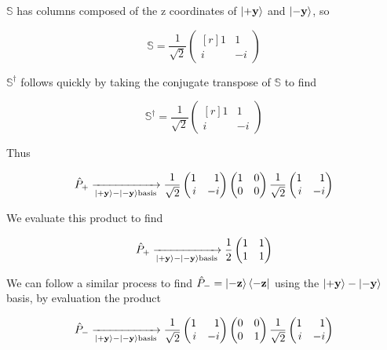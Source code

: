 \documentclass[11pt]{amsart}
\begin{document}
$\mathbb{S}$ has columns composed of the z coordinates of $\ket{+\textbf{y}}$ and $\ket{-\textbf{y}}$, so 

\[
\mathbb{S}=\frac{1}{\sqrt{2}}
\begin{pmatrix*}[r]
1&1\\
i&-i
\end{pmatrix*}
\]

$\mathbb{S}^{\dagger}$ follows quickly by taking the conjugate transpose of $\mathbb{S}$ to find

\[
\mathbb{S}^{\dagger}=\frac{1}{\sqrt{2}}
\begin{pmatrix*}[r]
1&1\\
i&-i
\end{pmatrix*}
\]

Thus 

\[
\hat{P}_+\xrightarrow[\ket{+\textbf{y}}-\ket{-\textbf{y}}\text{basis}]{}
\frac{1}{\sqrt{2}}
\begin{pmatrix*}[r]
1&1\\
i&-i
\end{pmatrix*}
\begin{pmatrix*}[r]
1&0\\
0&0
\end{pmatrix*}
\frac{1}{\sqrt{2}}
\begin{pmatrix*}[r]
1&1\\
i&-i
\end{pmatrix*}
\]

\vspace{6mm}

We evaluate this product to find

\[
\hat{P}_+\xrightarrow[\ket{+\textbf{y}}-\ket{-\textbf{y}}\text{basis}]{}
\frac{1}{2}
\begin{pmatrix*}[r]
1&1\\
1&1
\end{pmatrix*}
\]

\vspace{5mm}

We can follow a similar process to find $\hat{P}_-=\ket{-\textbf{z}}\bra{-\textbf{z}}$ using the  $\ket{+\textbf{y}}-\ket{-\textbf{y}}$ basis, by evaluation the product

\[
\hat{P}_-\xrightarrow[\ket{+\textbf{y}}-\ket{-\textbf{y}}\text{basis}]{}
\frac{1}{\sqrt{2}}
\begin{pmatrix*}[r]
1&1\\
i&-i
\end{pmatrix*}
\begin{pmatrix*}[r]
0&0\\
0&1
\end{pmatrix*}
\frac{1}{\sqrt{2}}
\begin{pmatrix*}[r]
1&1\\
i&-i
\end{pmatrix*}
\]
\end{document}
